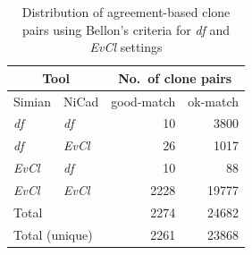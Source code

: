\documentclass{sig-alternate-05-2015}
\begin{document}
\begin{table}[H]
	\centering
	\caption{Distribution of agreement-based clone pairs using Bellon's criteria for \textit{df} and \textit{EvCl} settings}
	\label{t_agreed_good_clone_pairs}
	\small
	\begin{tabular}{l|l|r|r}
		\hline
		\multicolumn{2}{c|}{Tool} & \multicolumn{2}{c}{No.~of clone pairs} \\
		\hline
		Simian & NiCad & good-match & ok-match \\
		\hline
		\textit{df} & \textit{df} & 10 	& 3800 \\ 
		\textit{df} & \textit{EvCl} 	& 26 	& 1017 \\ 
		\textit{EvCl} 	& \textit{df} 	& 10 	& 88 \\
		\textit{EvCl} 	& \textit{EvCl} 	& 2228 & 19777 \\ 
		\hline
		\multicolumn{2}{l|}{Total} & 2274 & 24682 \\
		\hline
		\multicolumn{2}{l|}{Total (unique)} & 2261 & 23868 \\
		\hline
	\end{tabular}
\end{table}
\end{document}
